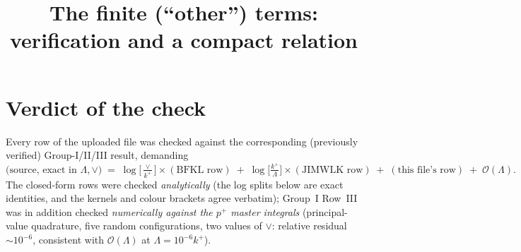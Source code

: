 \documentclass[11pt]{article}
\title{The finite (``other'') terms: verification and a compact relation}
\date{}
\newcommand{\LB}{\log\!\big[\tfrac{\vee}{k^{+}}\big]}
\newcommand{\LJ}{\log\!\big[\tfrac{k^{+}}{\Lambda}\big]}
\begin{document}
\maketitle
\vspace{-3em}
\section{Verdict of the check}

Every row of the uploaded file was checked against the corresponding (previously verified)
Group-I/II/III result, demanding
\[
\text{(source, exact in }\Lambda,\vee)
\;=\;\LB\times(\text{BFKL row})\;+\;\LJ\times(\text{JIMWLK row})\;+\;(\text{this file's row})\;+\;\mathcal O(\Lambda).
\]
The closed-form rows were checked \emph{analytically} (the log splits below are exact
identities, and the kernels and colour brackets agree verbatim); Group~I Row~III was in
addition checked \emph{numerically against the $p^{+}$ master integrals} (principal-value
quadrature, five random configurations, two values of $\vee$: relative residual
$\sim10^{-6}$, consistent with $\mathcal O(\Lambda)$ at $\Lambda=10^{-6}k^{+}$).
\end{document}
